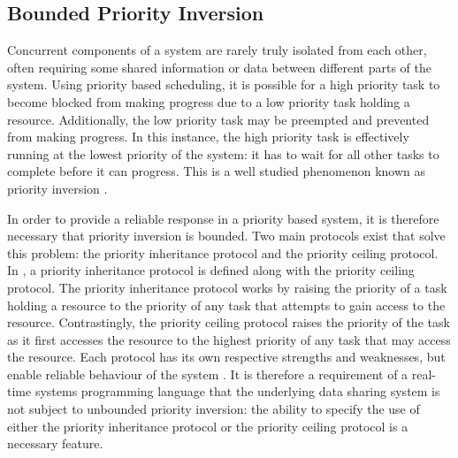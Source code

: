 \subsection{Bounded Priority Inversion}
Concurrent components of a system are rarely truly isolated from each other, often 
requiring some shared information or data between different parts of the system. 
Using priority based scheduling, it is possible for 
a high priority task to become blocked from making progress due to a low
priority task holding a resource. Additionally, the low priority task may be 
preempted and prevented from making progress. In this instance, the high priority task is 
effectively running at the lowest priority of the system: it has to wait for all other 
tasks to complete before it can progress. This is a well studied phenomenon known 
as priority inversion 
\cite{real-time-systems}. 
\par\bigskip\noindent
In order to provide a reliable response in a priority based system, it is 
therefore necessary that priority inversion is bounded.
Two main protocols exist that solve this problem: the priority inheritance protocol 
and the priority ceiling protocol. 
In \cite{57058}, a priority inheritance protocol is defined along with the priority 
ceiling protocol. 
The priority inheritance protocol works by raising the priority of a task 
holding a resource to the priority of any task that attempts to gain access 
to the resource.
Contrastingly, the priority ceiling protocol raises the priority of the task as 
it first accesses 
the resource to the highest priority of any task that may access the resource. 
Each protocol has its own respective 
strengths and weaknesses, but enable reliable behaviour of the system 
\cite{mall2009real}.
It is therefore a requirement of a real-time systems programming language 
that the underlying data sharing system is not subject to unbounded priority 
inversion: the ability to specify the use of either the priority inheritance 
protocol or the priority ceiling protocol is a necessary feature.  

